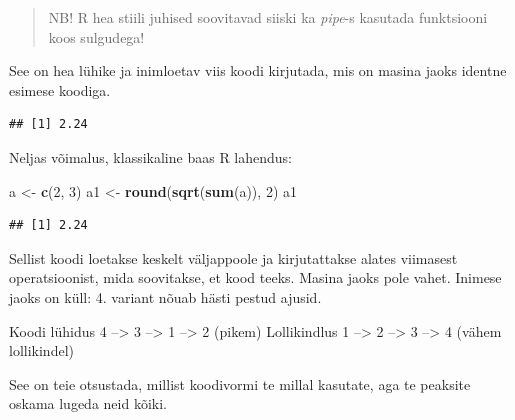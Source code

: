 \documentclass[]{book}
\newenvironment{Shaded}{\begin{snugshade}}{\end{snugshade}}
\newcommand{\KeywordTok}[1]{\textcolor[rgb]{0.13,0.29,0.53}{\textbf{#1}}}
\newcommand{\DecValTok}[1]{\textcolor[rgb]{0.00,0.00,0.81}{#1}}
\newcommand{\StringTok}[1]{\textcolor[rgb]{0.31,0.60,0.02}{#1}}
\newcommand{\OperatorTok}[1]{\textcolor[rgb]{0.81,0.36,0.00}{\textbf{#1}}}
\newcommand{\NormalTok}[1]{#1}
\begin{document}
\begin{quote}
NB! R hea stiili juhised soovitavad siiski ka \emph{pipe}-s kasutada
funktsiooni koos sulgudega!
\end{quote}

See on hea lühike ja inimloetav viis koodi kirjutada, mis on masina
jaoks identne esimese koodiga.

\begin{Shaded}
\end{Shaded}

\begin{verbatim}
## [1] 2.24
\end{verbatim}

Neljas võimalus, klassikaline baas R lahendus:

\begin{Shaded}
\begin{Highlighting}[]
\NormalTok{a <-}\StringTok{ }\KeywordTok{c}\NormalTok{(}\DecValTok{2}\NormalTok{, }\DecValTok{3}\NormalTok{)}
\NormalTok{a1 <-}\StringTok{ }\KeywordTok{round}\NormalTok{(}\KeywordTok{sqrt}\NormalTok{(}\KeywordTok{sum}\NormalTok{(a)), }\DecValTok{2}\NormalTok{)}
\NormalTok{a1}
\end{Highlighting}
\end{Shaded}

\begin{verbatim}
## [1] 2.24
\end{verbatim}

Sellist koodi loetakse keskelt väljappoole ja kirjutattakse alates
viimasest operatsioonist, mida soovitakse, et kood teeks. Masina jaoks
pole vahet. Inimese jaoks on küll: 4. variant nõuab hästi pestud ajusid.

Koodi lühidus 4 --\textgreater{} 3 --\textgreater{} 1 --\textgreater{} 2
(pikem) Lollikindlus 1 --\textgreater{} 2 --\textgreater{} 3
--\textgreater{} 4 (vähem lollikindel)

See on teie otsustada, millist koodivormi te millal kasutate, aga te
peaksite oskama lugeda neid kõiki.
\end{document}
